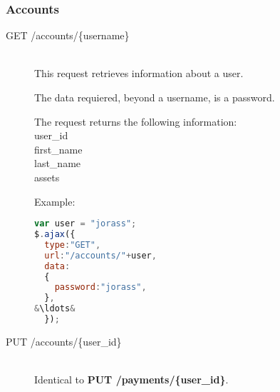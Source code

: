 \documentclass[a4paper]{article}
\begin{document}
\subsubsection{Accounts}
\begin{description}
\item[GET /accounts/\{username\}]\hfill\\
  This request retrieves information about a user.

  The data requiered, beyond a username, is a password.

  The request returns the following information:\hfill\\
  user\_id\hfill\\
  first\_name\hfill\\
  last\_name\hfill\\
  assets

  Example:\hfill\\
    \begin{lstlisting}[language=javascript, frame=single, showstringspaces = false, basicstyle=\small\ttfamily, escapechar=\&]
var user = "jorass";
$.ajax({
  type:"GET",
  url:"/accounts/"+user,
  data:
  {
    password:"jorass",
  },
&\ldots&
  });
    \end{lstlisting}
\item[PUT /accounts/\{user\_id\}]\hfill\\
  Identical to \textbf{PUT /payments/\{user\_id\}}.
\end{description}
\end{document}

